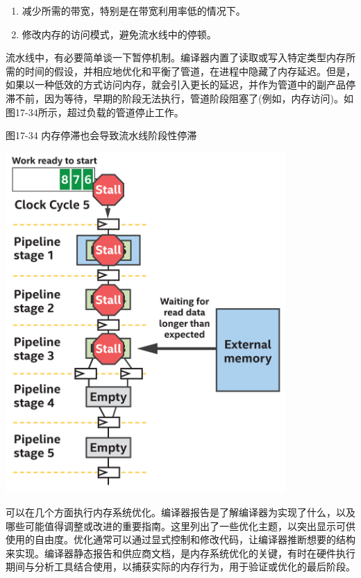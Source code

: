 \begin{enumerate}
	\item 减少所需的带宽，特别是在带宽利用率低的情况下。
	\item 修改内存的访问模式，避免流水线中的停顿。
\end{enumerate}

流水线中，有必要简单谈一下暂停机制。编译器内置了读取或写入特定类型内存所需的时间的假设，并相应地优化和平衡了管道，在进程中隐藏了内存延迟。但是，如果以一种低效的方式访问内存，就会引入更长的延迟，并作为管道中的副产品停滞不前，因为等待，早期的阶段无法执行，管道阶段阻塞了(例如，内存访问)。如图17-34所示，超过负载的管道停止工作。\par

\hspace*{\fill} \par %
图17-34 内存停滞也会导致流水线阶段性停滞
\begin{center}
	\includegraphics[width=0.8\textwidth]{content/chapter-17/images/26}
\end{center}

可以在几个方面执行内存系统优化。编译器报告是了解编译器为实现了什么，以及哪些可能值得调整或改进的重要指南。这里列出了一些优化主题，以突出显示可供使用的自由度。优化通常可以通过显式控制和修改代码，让编译器推断想要的结构来实现。编译器静态报告和供应商文档，是内存系统优化的关键，有时在硬件执行期间与分析工具结合使用，以捕获实际的内存行为，用于验证或优化的最后阶段。\par

